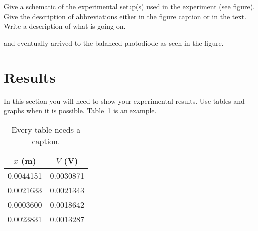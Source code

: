 Give a schematic of the experimental setup(s) used in the experiment (see
figure). Give the description of  abbreviations
either in the figure caption or in the text. Write a description of what is
going on.


and eventually arrived to the
balanced photodiode as seen in the figure.


\section{Results}

In this section you will need to show your experimental results. Use tables and
graphs when it is possible. Table~\ref{tbl:bins} is an example.

\begin{table}[ht]
  \begin{center}
    \caption{Every table needs a caption.}
    \label{tbl:bins} %
    \begin{tabular}{|cc|}
      \hline
      \multicolumn{1}{|c}{$x$ (m)} & \multicolumn{1}{c|}{$V$ (V)} \\
      \hline
      0.0044151                    & 0.0030871                    \\
      0.0021633                    & 0.0021343                    \\
      0.0003600                    & 0.0018642                    \\
      0.0023831                    & 0.0013287                    \\
      \hline
    \end{tabular}
  \end{center}
\end{table}

